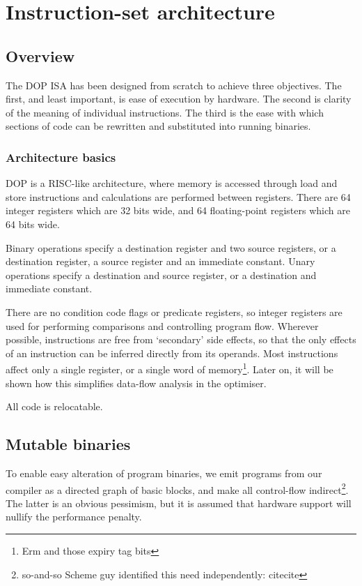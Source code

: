 \chapter{Instruction-set architecture}

\section{Overview}

The DOP ISA has been designed from scratch to achieve three objectives. The first, and least important, is ease of execution by hardware. The second is clarity of the meaning of individual instructions. The third is the ease with which sections of code can be rewritten and substituted into running binaries.

\subsection{Architecture basics}

DOP is a RISC-like architecture, where memory is accessed through load and store instructions and calculations are performed between registers. There are 64 integer registers which are 32 bits wide, and 64 floating-point registers which are 64 bits wide.

Binary operations specify a destination register and two source registers, or a destination register, a source register and an immediate constant. Unary operations specify a destination and source register, or a destination and immediate constant.

There are no condition code flags or predicate registers, so integer registers are used for performing comparisons and controlling program flow. Wherever possible, instructions are free from `secondary' side effects, so that the only effects of an instruction can be inferred directly from its operands. Most instructions affect only a single register, or a single word of memory\footnote{Erm and those expiry tag bits}. Later on, it will be shown how this simplifies data-flow analysis in the optimiser.

All code is relocatable.

\section{Mutable binaries}

To enable easy alteration of program binaries, we emit programs from our compiler as a directed graph of basic blocks, and make all control-flow indirect\footnote{so-and-so Scheme guy identified this need independently: citecite}. The latter is an obvious pessimism, but it is assumed that hardware support will nullify the performance penalty.

